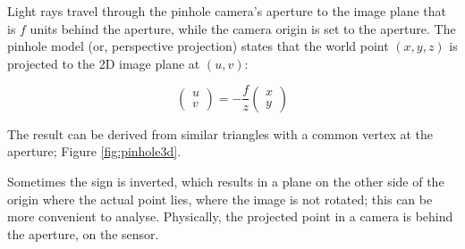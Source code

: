 
Light rays travel through the pinhole camera's aperture to the image plane that is $f$ units behind the aperture, while the camera origin is set to the aperture.
The pinhole model (or, perspective projection) states that the world point $(x, y, z)$ is projected to the 2D image plane at $(u, v)$:

\begin{equation}
\begin{pmatrix}
u \\ v
\end{pmatrix}
=
-\frac{f}{z} \begin{pmatrix}
x \\ y
\end{pmatrix}
\end{equation}

The result can be derived from similar triangles with a common vertex at the aperture; Figure \ref{fig:pinhole3d}.

Sometimes the sign is inverted, which results in a plane on the other side of the origin where the actual point lies, where the image is not rotated; this can be more convenient to analyse.
Physically, the projected point in a camera is behind the aperture, on the sensor.
\cite{hartley03multiview}

%

